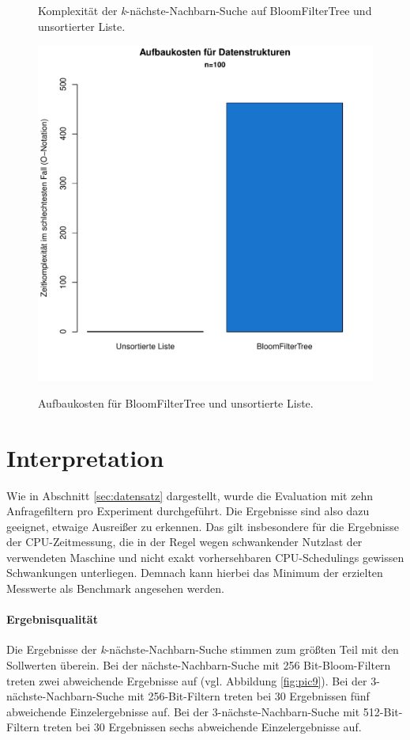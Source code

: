 \begin{figure}[hptb]
	\caption[Komplexität der \textit{k}-nächste-Nachbarn-Suche auf BloomFilterTree und unsortierter Liste]{Komplexität der \textit{k}-nächste-Nachbarn-Suche auf BloomFilterTree und unsortierter Liste.}\label{fig:pic19}
\end{figure} 
\begin{figure}[hptb]
	\centering
	\includegraphics[scale=0.7]{pictures/cost.pdf}\\
	\caption[Aufbaukosten für BloomFilterTree und unsortierte Liste]{Aufbaukosten für BloomFilterTree und unsortierte Liste.}\label{fig:pic20}
\end{figure}
\newpage
\section{Interpretation}\label{sec:interpretation}
Wie in Abschnitt \ref{sec:datensatz} dargestellt, wurde die Evaluation mit zehn Anfragefiltern pro Experiment durchgeführt. Die Ergebnisse sind also dazu geeignet, etwaige Ausreißer zu erkennen. Das gilt insbesondere für die Ergebnisse der CPU-Zeitmessung, die in der Regel wegen schwankender Nutzlast der verwendeten Maschine und nicht exakt vorhersehbaren CPU-Schedulings gewissen Schwankungen unterliegen. Demnach kann hierbei das Minimum der erzielten Messwerte als Benchmark angesehen werden. 
\paragraph*{Ergebnisqualität}
Die Ergebnisse der \textit{k}-nächste-Nachbarn-Suche stimmen zum größten Teil mit den Sollwerten überein. Bei der nächste-Nachbarn-Suche mit 256 Bit-Bloom-Filtern treten zwei abweichende Ergebnisse auf (vgl. Abbildung \ref{fig:pic9}). Bei der 3-nächste-Nachbarn-Suche mit 256-Bit-Filtern treten bei 30 Ergebnissen fünf abweichende Einzelergebnisse auf. Bei der 3-nächste-Nachbarn-Suche mit 512-Bit-Filtern treten bei 30 Ergebnissen sechs abweichende Einzelergebnisse auf. 

